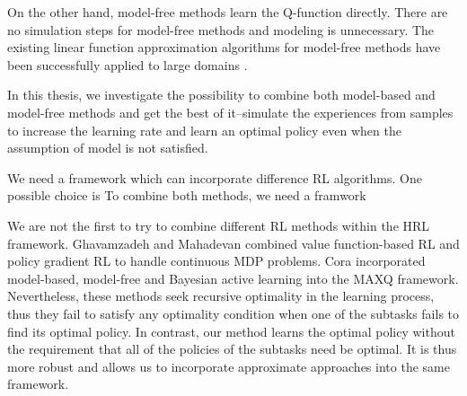 On the other hand, model-free methods learn the Q-function directly. 
There are no simulation steps for model-free methods and modeling is unnecessary. 
The existing linear function approximation algorithms for model-free methods have been successfully 
applied to large domains \cite{LSTD99}\cite{KeepAway}. 



In this thesis, we investigate the possibility to combine both model-based and model-free methods 
and get the best of it--simulate the experiences from samples to increase the learning rate
and learn an optimal policy even when the assumption of model is not satisfied. 

We need a framework which can incorporate difference RL algorithms.
One possible choice is 
To combine both methods, we need a framwork 




We are not the first to try to combine different RL methods within the HRL framework.  
Ghavamzadeh and Mahadevan \cite{HybridPolicy} combined value function-based RL and policy gradient RL to handle
continuous MDP problems. Cora \cite{Vlad} incorporated model-based, model-free and Bayesian active learning into the MAXQ framework.
Nevertheless, these methods seek recursive optimality in the learning process, 
thus they fail to satisfy any optimality condition when one of the subtasks
fails to find its optimal policy.
In contrast, our method learns the optimal policy without the requirement that 
all of the policies of the subtasks need be optimal. It is thus more robust and allows us to incorporate approximate
approaches into the same framework.


